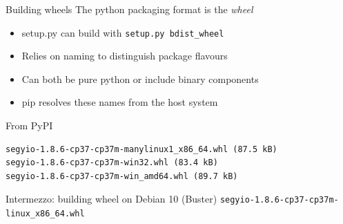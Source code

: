 \documentclass[pdf]{beamer}
\begin{document}
\begin{frame}[fragile]{Building wheels}
    The python packaging format is the \emph{wheel}

    \begin{block}{}
        \begin{itemize}
            \item setup.py can build with \verb|setup.py bdist_wheel|
            \item Relies on naming to distinguish package flavours
            \item Can both be pure python or include binary components
            \item pip resolves these names from the host system
        \end{itemize}
    \end{block}

    \begin{block}{From PyPI}
        \begin{verbatim}
segyio-1.8.6-cp37-cp37m-manylinux1_x86_64.whl (87.5 kB)
segyio-1.8.6-cp37-cp37m-win32.whl (83.4 kB)
segyio-1.8.6-cp37-cp37m-win_amd64.whl (89.7 kB)
        \end{verbatim}
    \end{block}

\end{frame}

\begin{frame}[fragile]{Intermezzo: building wheel on Debian 10 (Buster)}
    \verb|segyio-1.8.6-cp37-cp37m-linux_x86_64.whl|
\end{frame}
\end{document}
